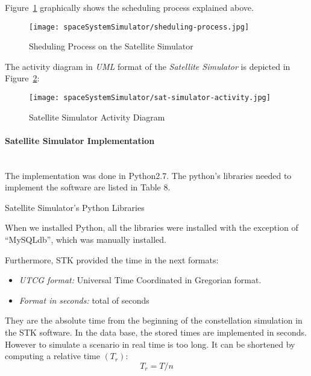 Figure~\ref{fig:sss-sheduling-process} graphically shows the scheduling process explained above.


\begin{figure}[!h]
\begin{center}
\texttt{[image: spaceSystemSimulator/sheduling-process.jpg]}
\caption{Sheduling Process on the Satellite Simulator}
\label{fig:sss-sheduling-process}
\end{center}
\end{figure}


The activity diagram in \emph{UML} format of the \emph{Satellite Simulator} is
depicted in Figure~\ref{fig:sss-satellite-activity}:

\begin{figure}[!h]
\begin{center}
\texttt{[image: spaceSystemSimulator/sat-simulator-activity.jpg]}
\caption{Satellite Simulator Activity Diagram}
\label{fig:sss-satellite-activity}
\end{center}
\end{figure}

\paragraph{Satellite Simulator Implementation}
\label{par:sat-simulator-implementation}~\\

The implementation was done in Python2.7. The python's libraries needed to
implement the software are listed in Table 8.



\begin{table}[hp]
  \centering
  {\small
  
  }
  \caption{Satellite Simulator's Python Libraries}
  \label{table:sss-satellite-libraries}
\end{table}

When we installed Python, all the libraries were installed with the exception of ``MySQLdb'', which was manually installed.

Furthermore, STK provided the time in the next formats:
\begin{itemize}
\item \emph{UTCG format:} Universal Time Coordinated in Gregorian format.
\item \emph{Format in seconds:} total of seconds
\end{itemize}
They are the absolute time from the beginning of the constellation simulation in
the STK software. In the data base, the stored times are implemented in
seconds. However to simulate a scenario in real time is too long. It can be
shortened by computing a relative time $(T_r)$:
\begin{equation}\label{eq:TR}
	T_r=T/n	
\end{equation}

